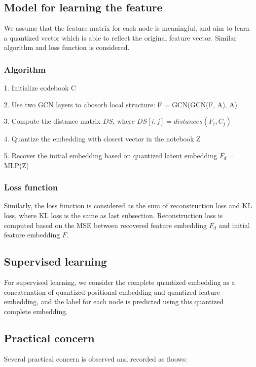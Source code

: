 \documentclass[12pt]{amsart}
\begin{document}
\subsection{Model for learning the feature}

\hfill

We assume that the feature matrix for each node is meaningful, 
and aim to learn a quantized vector which is able to reflect the original feature vector. Similar algorithm and loss function is considered.

\subsubsection{Algorithm}
\hfill

1. Initialize codebook C

2. Use two GCN layers to abosorb local structure: F = GCN(GCN(F, A), A)

3. Compute the distance matrix $DS$, where $DS[i,j] = distances(F_i, C_j)$  

4. Quantize the embedding with closest vector in the notebook Z 

5. Recover the initial embedding based on quantized latent embedding $F_d$ = MLP(Z)

\subsubsection{Loss function}
\hfill

Similarly, the loss function is considered as the sum of reconstruction loss and KL loss, where KL 
loss is the same as last subsection. Reconstruction loss is computed based on the MSE between recovered feature embedding $F_d$ and initial feature embedding $F$.


\subsection{Supervised learning}
For supervised learning, we consider the complete quantized embedding as a concatenation of quantized positional embedding and quantized feature embedding, and the label for each node is predicted using this quantized complete embedding.



\subsection{Practical concern}
Several practical concern is observed and recorded as floows:
\end{document}

